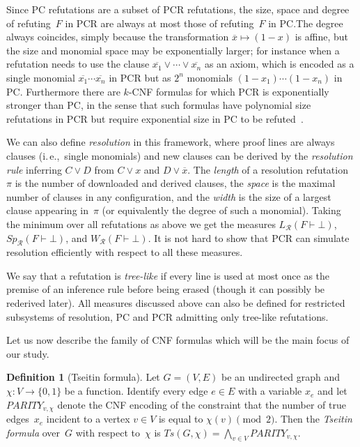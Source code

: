 \documentclass[11pt]{article}
\numberwithin{equation}{section}
\theoremstyle{definition}
\newtheorem{definition}[theorem]{Definition}
\theoremstyle{plain}
\newcommand{\ie}{i.\,e.}
\theoremstyle{plain}
\theoremstyle{definition}
\newcommand{\funcdescr}[3]{\ensuremath{ #1 : #2 \to #3}}
\newcommand{\set}[1]{\{ #1 \}}
\newcommand{\olnot}[1]{\overline{#1}}
\newcommand{\clwidth}{k}
\newcommand{\introduceterm}[1]{{\emph{#1}}}
\newcommand{\wrt}{with respect to\xspace}
\newcommand{\ieComma}{\ie,\ }
\newcommand{\proofsystemsubindexformat}[1]{\scriptscriptstyle{\mathcal{#1}}}
\newcommand{\resnot}{\proofsystemsubindexformat{R}}
\newcommand{\proofstd}{\pi}
\newcommand{\clc}{\ensuremath{C}}
\newcommand{\cld}{\ensuremath{D}}
\newcommand{\derivabbrevsmall}[2]{( #1 \vdash #2 )}
\newcommand{\refutabbrevsmall}[1]{\derivabbrevsmall{#1}{\!\bot}}
\newcommand{\genericrefsmall}[3]{{\mathit{#1}}_{#2}\refutabbrevsmall{#3}}
\newcommand{\lengthref}[2][]{\genericrefsmall{L}{#1}{#2}}
\newcommand{\widthref}[2][]{\genericrefsmall{W}{#1}{#2}}
\newcommand{\clspaceref}[2][]{\genericrefsmall{Sp}{#1}{#2}}
\newcommand{\formulaformat}[1]{\mathit{#1}}
\newcommand{\tseitinnot}[2]{\formulaformat{Ts}({#1,#2})}
\newcommand{\tseitinparity}[2]{\ensuremath{\formulaformat{PARITY}_{#1,#2}}}
\newcommand{\tseitincharge}{\chi}
\begin{document}
Since PC refutations are a subset of PCR refutations, the size, space
and degree of refuting~$F$ in PCR are always at most those of
refuting~$F$ in PC.\@ The degree always coincides, simply because the
%
%
transformation $\olnot{x} \mapsto (1-x)$ is affine, 
but the size and
monomial space may be exponentially larger; for instance when
a refutation needs to use the clause
$\olnot{x_1}\lor\cdots\lor\olnot{x_n}$ as an axiom, which is encoded
as a single monomial $\olnot{x_1}\cdots\olnot{x_n}$ in PCR but as
$2^n$ monomials $(1-x_1)\cdots(1-x_n)$ in PC.
%
Furthermore there are $\clwidth$-CNF formulas for which PCR is
exponentially stronger than PC, in the sense that such formulas have
polynomial size refutations in PCR but require exponential size in PC to be
%
refuted~\cite{dRLNS21Negative}.

We can also define \introduceterm{resolution} in this framework, 
where proof lines are always clauses (\ieComma single monomials)
and new clauses can be derived by the 
\introduceterm{resolution rule}
inferring
$\clc \lor \cld$
from
$\clc \lor x$
and
$\cld \lor \olnot{x}$.
The \introduceterm{length} of a resolution refutation~$\proofstd$ is the number
of downloaded and derived clauses, the \introduceterm{space} is the
maximal number of clauses in any configuration, and the  
\introduceterm{width} is the size of a largest clause appearing
in~$\proofstd$ (or equivalently the degree of such a monomial). 
Taking the minimum over all refutations as above we
get the measures
$\lengthref[\resnot]{F}$,
$\clspaceref[\resnot]{F}$,
and
$\widthref[\resnot]{F}$.
It is not hard to show that PCR can simulate resolution efficiently
\wrt all these measures.

We say that a refutation is \introduceterm{tree-like} if every line is
used at most once as  the premise of an inference rule before being
erased (though it can possibly be rederived later). All 
measures
discussed above can also be defined for restricted subsystems of
resolution, PC and PCR admitting only tree-like refutations.

Let us now
describe
%
the family of CNF formulas 
which will be the main focus
of our study.

\begin{definition}[Tseitin formula]
  \label{def:tseitinmod2}
  Let $G = (V,E)$ be an undirected graph and 
  $\funcdescr{\tseitincharge}{V}{\set{0,1}}$ 
  be a function. 
  Identify every edge $e \in E$ with a variable $x_e$
  and  let
  $\tseitinparity{v}{\tseitincharge}$
  denote the CNF encoding
%
  of the constraint
  that the number of true edges~$x_e$ incident to a vertex $v \in V$
  is equal to $\tseitincharge(v) \pmod{2}$.
%
%
%
  Then the \introduceterm{Tseitin formula} over~$G$ \wrt{}~$\tseitincharge$
  is $\tseitinnot{G}{\tseitincharge}=\bigwedge_{v\in V}\tseitinparity{v}{\tseitincharge}$.
\end{definition}
\end{document}
